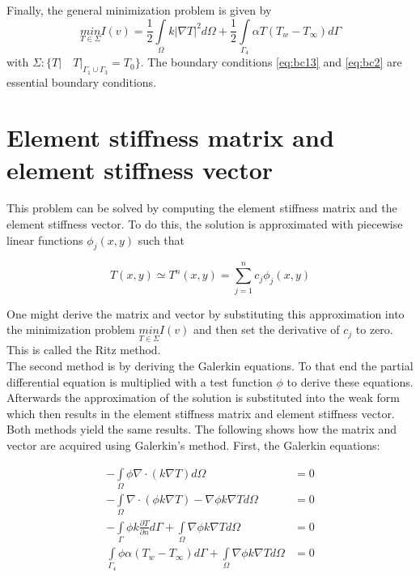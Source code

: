 \documentclass[10pt,a4paper]{article}
\begin{document}
Finally, the general minimization problem is given by
\begin{equation}\label{eq:minf}
\underset{T\in\Sigma} {min }I(v) =\frac{1}{2}\underset{\Omega}{\int}k\lvert\nabla T \rvert ^{2}  d\Omega + \frac{1}{2}\underset{\Gamma_4}{\int}\alpha T(T_w-T_{\infty})d\Gamma 
\end{equation}
with $\Sigma: \{T\rvert\quad T\rvert_{\Gamma_1\cup\Gamma_3}=T_0\}$. The boundary conditions \eqref{eq:bc13} and \eqref{eq:bc2} are essential boundary conditions.

\section{Element stiffness matrix and element stiffness vector}
This problem can be solved by computing the element stiffness matrix and the element stiffness vector.
To do this, the solution is approximated with piecewise linear functions $\phi_j(x,y)$ such that

\begin{equation}\label{eq:app}
T(x,y) \simeq T^n (x,y) =\displaystyle\sum^n_{j=1} c_j \phi_j(x,y)
\end{equation}

One might derive the matrix and vector by substituting this approximation into the minimization problem $\underset{T\in\Sigma} {min}I(v) $ and then set the derivative of $c_j$ to zero. This is called the Ritz method.\\

The second method is by deriving the Galerkin equations. To that end the partial differential equation is multiplied with a test function $\phi$ to derive these equations. Afterwards the approximation of the solution is substituted into the weak form which then results in the element stiffness matrix and element stiffness vector. \\

Both methods yield the same results. The following shows how the matrix and vector are acquired using Galerkin's method. First, the Galerkin equations:

\begin{align}\label{eq:Gal1}
-\underset{\Omega}{\int}\phi \nabla \cdot(k\nabla T)d\Omega&=0\nonumber\\
-\underset{\Omega}{\int} \nabla \cdot \left(\phi k \nabla T\right)- \nabla \phi k \nabla Td\Omega &=0\nonumber\\
-\underset{\Gamma}{\int}\phi k \frac{\partial T}{\partial n} d\Gamma + \underset{\Omega}{\int}\nabla \phi k \nabla Td\Omega &=0\nonumber\\
\underset{\Gamma_4}{\int}\phi \alpha \left(T_w -T_{\infty}\right)d\Gamma + \underset{\Omega}{\int}\nabla \phi k \nabla T d\Omega&=0
\end{align}
\end{document}
